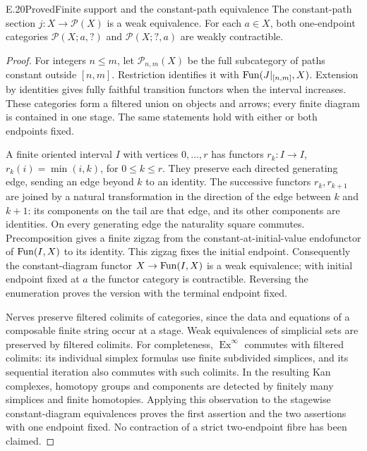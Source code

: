 \begin{claim}{E.20}{Proved}{Finite support and the constant-path equivalence}
The constant-path section $j:X\to\mathcal P(X)$ is a weak equivalence. For each $a\in X$, both one-endpoint categories $\mathcal P(X;a,?)$ and $\mathcal P(X;?,a)$ are weakly contractible.
\end{claim}
\begin{proof}
For integers $n\leq m$, let $\mathcal P_{n,m}(X)$ be the full subcategory of paths constant outside $[n,m]$. Restriction identifies it with $\operatorname{Fun}(J|_{[n,m]},X)$. Extension by identities gives fully faithful transition functors when the interval increases. These categories form a filtered union on objects and arrows; every finite diagram is contained in one stage. The same statements hold with either or both endpoints fixed.

A finite oriented interval $I$ with vertices $0,\ldots,r$ has functors $r_k:I\to I$, $r_k(i)=\min(i,k)$, for $0\leq k\leq r$. They preserve each directed generating edge, sending an edge beyond $k$ to an identity. The successive functors $r_k,r_{k+1}$ are joined by a natural transformation in the direction of the edge between $k$ and $k+1$: its components on the tail are that edge, and its other components are identities. On every generating edge the naturality square commutes. Precomposition gives a finite zigzag from the constant-at-initial-value endofunctor of $\operatorname{Fun}(I,X)$ to its identity. This zigzag fixes the initial endpoint. Consequently the constant-diagram functor $X\to\operatorname{Fun}(I,X)$ is a weak equivalence; with initial endpoint fixed at $a$ the functor category is contractible. Reversing the enumeration proves the version with the terminal endpoint fixed.

Nerves preserve filtered colimits of categories, since the data and equations of a composable finite string occur at a stage. Weak equivalences of simplicial sets are preserved by filtered colimits. For completeness, $\operatorname{Ex}^{\infty}$ commutes with filtered colimits: its individual simplex formulas use finite subdivided simplices, and its sequential iteration also commutes with such colimits. In the resulting Kan complexes, homotopy groups and components are detected by finitely many simplices and finite homotopies. Applying this observation to the stagewise constant-diagram equivalences proves the first assertion and the two assertions with one endpoint fixed. No contraction of a strict two-endpoint fibre has been claimed.
\end{proof}

